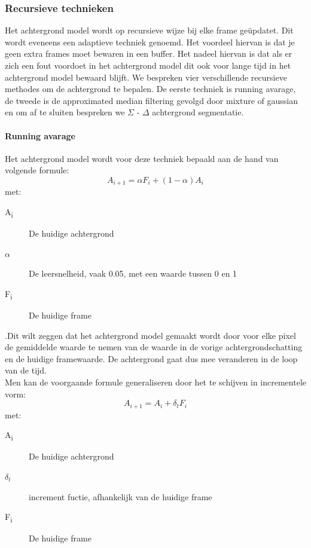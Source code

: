 \subsubsection{Recursieve technieken}
\label{refRT}
Het achtergrond model wordt op recursieve wijze bij elke frame ge\"updatet. Dit wordt eveneens een adaptieve techniek genoemd.  Het voordeel hiervan is dat je geen extra frames moet bewaren in een buffer. Het nadeel hiervan is dat als er zich een fout voordoet in het achtergrond model dit ook voor lange tijd in het achtergrond model bewaard blijft. We bespreken vier verschillende recursieve methodes om de achtergrond te bepalen. De eerste techniek is running avarage,  de tweede is de approximated median filtering gevolgd door mixture of gaussian en om af te sluiten bespreken we $\Sigma$ - $\Delta$ achtergrond segmentatie.

\paragraph{Running avarage}
\label{refRUA}
Het achtergrond model wordt voor deze techniek bepaald aan de hand van volgende formule:
\begin{displaymath}
A_{i+1}=\alpha F_i+(1-\alpha)A_i
\end{displaymath}
met:
\begin{description}
	\item[A\textsubscript{i}] De huidige achtergrond
	\item[$\alpha$] De leersnelheid, vaak 0.05, met een waarde tussen 0 en 1
	\item[F\textsubscript{i}] De huidige frame
\end{description}
\cite{bibBEt}.Dit wilt zeggen dat het achtergrond model gemaakt wordt door voor elke pixel de gemiddelde waarde te nemen van de waarde in de vorige achtergrondschatting en de huidige framewaarde. De achtergrond gaat dus mee veranderen in de loop van de tijd. \\
Men kan de voorgaande formule generaliseren door het te schijven in incrementele vorm:
\begin{displaymath}
A_{i+1}=A_i+\delta_t F_i
\end{displaymath}
met:
\begin{description}
	\item[A\textsubscript{i}] De huidige achtergrond
	\item[$\delta_t$] increment fuctie, afhankelijk van de huidige frame
	\item[F\textsubscript{i}] De huidige frame
\end{description}
\cite{bibSDB}

